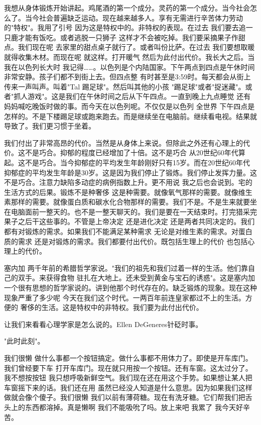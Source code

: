 我想从身体锻炼开始讲起。鸡尾酒的第一个成分。灵药的第一个成分。当今社会怎么了。当今社会普遍缺乏运动。现在越来越多人。享有无需进行辛苦体力劳动的"特权"。我用了引号 因为这是特权中的。非特权的表现。在过去 我们要去追一只鹿才能有饭吃。或者逃脱一只狮子 这样才不会被吃掉。我们要采摘果子作甜点。我们现在呢 去家里的甜点桌子就行了。或者叫份比萨。在过去 我们要想取暖就得收集木材。而现在呢 就这样。打开暖气 然后为此付出代价。我长大之后。当我在以色列长大时 我记得……。以色列是个内陆国家。下午两点到四点是午休时间 非常安静。孩子们都不到街上去。但四点整 有时甚至是3:59时。每天都会从街上传来一声叫声。叫着"Tal 踢足球"。然后叫其他的小孩 "踢足球"或者"捉迷藏"。或者"抓人游戏"。这是我们在午休时间之后从下午四点。一直到晚上九点睡觉 还有妈妈喊吃晚饭时做的事。而今天在以色列呢。不仅仅是以色列 全世界 下午四点是怎样的。不是下楼踢足球或跑来跑去。而是继续坐在电脑前。继续看电视。结果就导致了。我们更习惯于坐着。 

我们付出了非常高昂的代价。当然是从身体上来说。但除此之外还有心理上的代价。这不是巧合。抑郁的程度已经增加了十倍。这不是巧合 从20世纪60年代算起。这不是巧合。当今抑郁症的平均发生年龄刚好只有15岁。而在20世纪60年代 抑郁症的平均发生年龄是30岁。这是因为我们停止了锻炼。我们停止发挥力量。这不是巧合。注意力缺陷多动症的病例指数上升。更不用说 我之后也会说到。宅的生活方式的后果。锻炼不是种奢侈 这是种需要。就像氧气那样的需要。就像维生素那样的需要。就像蛋白质和碳水化合物那样的需要。我们不是。不是生来就要坐在电脑面前一整天的。也不是一整天聊天的。我们是要在一天结束时。打完猎采完果子之后干这些事的。不管是上帝决定 还是进化决定 还是两者共同决定的。我们都有对锻炼的需求。如果我们不能满足某种需求 无论是对维生素的需求。对蛋白质的需求 还是对锻炼的需求。我们都要付出代价。既包括生理上的代价 也包括心理上的代价。 

塞内加 两千年前的希腊哲学家说。"我们的祖先和我们过着一样的生活。他们靠自己的双手。来获得食物 驻扎在大地上。还未受到黄金与宝石的诱惑"。这是塞内加 一个很有思想的哲学家说的。讲到他那个时代存在的。缺乏锻炼的现象。现在这种现象严重了多少呢 今天在我们这个时代。一两百年前连皇家都过不上的生活。方便的 奢侈的生活。这是特权中的非特权。我们要为此付出代价。 

让我们来看看心理学家是怎么说的。Ellen DeGeneres针砭时事。 

"此时此刻"。 

我们很懒 做什么事都一个按钮搞定。做什么事都不用体力了。即使是开车库门。我们曾经要下车 打开车库门。现在就只用按一个按钮。还有车窗。这太过分了。我不想按按钮 我只想呼吸新鲜空气。我们现在还在用这个手势。如果想让某人把车窗摇下来的话。我们还在用 虽然已经没人知道是什么意思。因为如果我们这样做就会像个傻子。我们很懒 我们以前有薄荷糖。现在有洗牙糖。它们帮我们把舌头上的东西都溶掉。真是懒啊 我们不能吸吮了吗。放上来吧 我累了 我今天好辛苦。 

